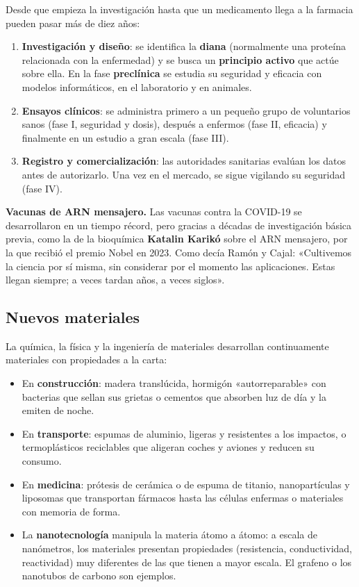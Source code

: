 Desde que empieza la investigación hasta que un medicamento llega a la farmacia pueden pasar más de diez años:
\begin{enumerate}
    \item \textbf{Investigación y diseño}: se identifica la \textbf{diana} (normalmente una proteína relacionada con la enfermedad) y
    se busca un \textbf{principio activo} que actúe sobre ella. En la fase \textbf{preclínica} se estudia su seguridad y eficacia
    con modelos informáticos, en el laboratorio y en animales.
    \item \textbf{Ensayos clínicos}: se administra primero a un pequeño grupo de voluntarios sanos (fase I, seguridad y dosis),
    después a enfermos (fase II, eficacia) y finalmente en un estudio a gran escala (fase III).
    \item \textbf{Registro y comercialización}: las autoridades sanitarias evalúan los datos antes de autorizarlo. Una vez en el
    mercado, se sigue vigilando su seguridad (fase IV).
\end{enumerate}

\begin{remark}
    \textbf{Vacunas de ARN mensajero.} Las vacunas contra la COVID-19 se desarrollaron en un tiempo récord, pero gracias a décadas de
    investigación básica previa, como la de la bioquímica \textbf{Katalin Karikó} sobre el ARN mensajero, por la que recibió el
    premio Nobel en 2023. Como decía Ramón y Cajal: «Cultivemos la ciencia por sí misma, sin considerar por el momento las
    aplicaciones. Estas llegan siempre; a veces tardan años, a veces siglos».
\end{remark}

\subsection{Nuevos materiales}

La química, la física y la ingeniería de materiales desarrollan continuamente materiales con propiedades a la carta:
\begin{itemize}
    \item En \textbf{construcción}: madera translúcida, hormigón «autorreparable» con bacterias que sellan sus grietas o cementos
    que absorben luz de día y la emiten de noche.
    \item En \textbf{transporte}: espumas de aluminio, ligeras y resistentes a los impactos, o termoplásticos reciclables que
    aligeran coches y aviones y reducen su consumo.
    \item En \textbf{medicina}: prótesis de cerámica o de espuma de titanio, nanopartículas y liposomas que transportan fármacos
    hasta las células enfermas o materiales con memoria de forma.
    \item La \textbf{nanotecnología} manipula la materia átomo a átomo: a escala de nanómetros, los materiales presentan
    propiedades (resistencia, conductividad, reactividad) muy diferentes de las que tienen a mayor escala. El grafeno o los
    nanotubos de carbono son ejemplos.
\end{itemize}

